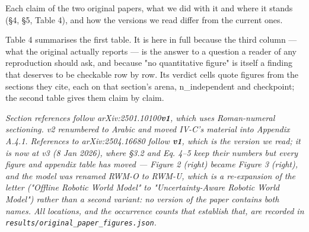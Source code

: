 \documentclass[10pt]{article}
\begin{document}
Each claim of the two original papers, what we did with it and where it stands (\S{}4, \S{}5, Table 4), and how the versions we read differ from the current ones.

Table 4 summarises the first table. It is here in full because the third column --- what the original actually reports --- is the answer to a question a reader of any reproduction should ask, and because "no quantitative figure" is itself a finding that deserves to be checkable row by row. Its verdict cells quote figures from the sections they cite, each on that section's arena, n\_independent and checkpoint; the second table gives them claim by claim.

\emph{Section references follow arXiv:2501.10100\textbf{v1}, which uses Roman-numeral sectioning. v2 renumbered to Arabic and moved IV-C's material into Appendix A.4.1. References to arXiv:2504.16680 follow \textbf{v1}, which is the version we read; it is now at v3 (8 Jan 2026), where \S{}3.2 and Eq. 4--5 keep their numbers but every figure and appendix table has moved --- Figure 2 (right) became Figure 3 (right), and the model was renamed RWM-O to RWM-U, which is a re-expansion of the letter ("Offline Robotic World Model" to "Uncertainty-Aware Robotic World Model") rather than a second variant: no version of the paper contains both names. All locations, and the occurrence counts that establish that, are recorded in \texttt{results/\allowbreak{}original\_\allowbreak{}paper\_\allowbreak{}figures\allowbreak{}.json}.}
\end{document}

